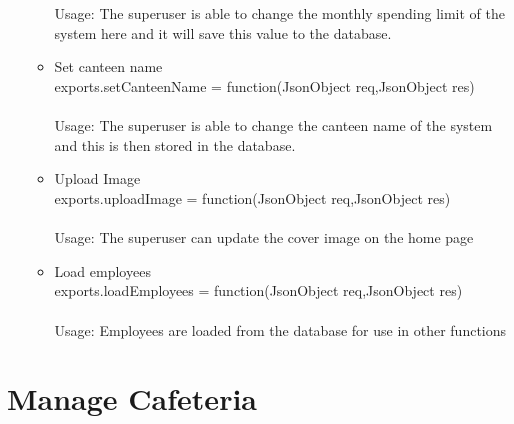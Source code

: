 \documentclass[a4paper,12pt]{article}
\begin{document}
\begin{enumerate}
\begin{itemize}
		\\ \\ Usage: The superuser is able to change the monthly spending limit of the system here and it will save this value to the database. 
		\item Set canteen name \\ exports.setCanteenName = function(JsonObject req,JsonObject res)
		\\ \\ Usage: The superuser is able to change the canteen name of the system and this is then stored in the database.
		\item Upload Image \\ exports.uploadImage = function(JsonObject req,JsonObject res) \\ \\
		Usage: The superuser can update the cover image on the home page
		\item Load employees \\ exports.loadEmployees = function(JsonObject req,JsonObject res)
		\\ \\ Usage: Employees are loaded from the database for use in other functions
	\end{itemize}
\end{enumerate}

\section{Manage Cafeteria}
\end{document}
